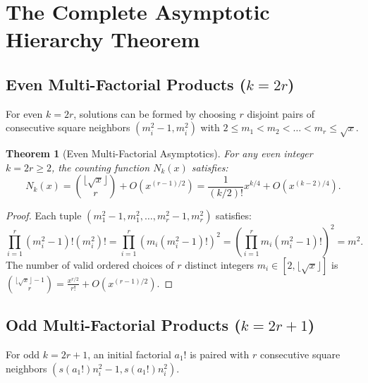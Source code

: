 \documentclass[11pt,a4paper]{article}
\newtheorem{theorem}{Theorem}
\begin{document}
\section{The Complete Asymptotic Hierarchy Theorem}

\subsection{Even Multi-Factorial Products ($k = 2r$)}
For even $k = 2r$, solutions can be formed by choosing $r$ disjoint pairs of consecutive square neighbors $(m_i^2 - 1, m_i^2)$ with $2 \le m_1 < m_2 < \dots < m_r \le \sqrt{x}$.

\begin{theorem}[Even Multi-Factorial Asymptotics]
For any even integer $k = 2r \ge 2$, the counting function $N_k(x)$ satisfies:
\begin{equation}
N_k(x) = \binom{\lfloor \sqrt{x} \rfloor}{r} + O(x^{(r-1)/2}) = \frac{1}{(k/2)!} x^{k/4} + O(x^{(k-2)/4}).
\end{equation}
\end{theorem}
\begin{proof}
Each tuple $(m_1^2-1, m_1^2, \dots, m_r^2-1, m_r^2)$ satisfies:
\[ \prod_{i=1}^r (m_i^2-1)! (m_i^2)! = \prod_{i=1}^r (m_i (m_i^2-1)!)^2 = \left(\prod_{i=1}^r m_i (m_i^2-1)!\right)^2 = m^2. \]
The number of valid ordered choices of $r$ distinct integers $m_i \in [2, \lfloor\sqrt{x}\rfloor]$ is $\binom{\lfloor\sqrt{x}\rfloor - 1}{r} = \frac{x^{r/2}}{r!} + O(x^{(r-1)/2})$.
\end{proof}

\subsection{Odd Multi-Factorial Products ($k = 2r + 1$)}
For odd $k = 2r + 1$, an initial factorial $a_1!$ is paired with $r$ consecutive square neighbors $(s(a_1!) n_i^2 - 1, s(a_1!) n_i^2)$.
\end{document}
